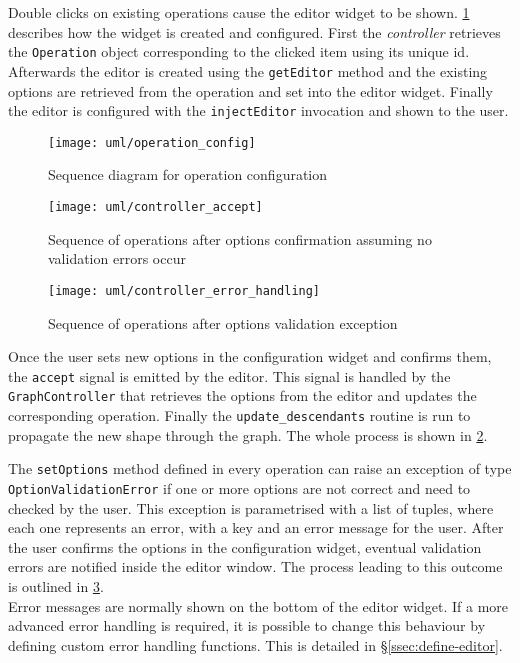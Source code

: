 \label{par:operation_config}\noindent
Double clicks on existing operations cause the editor widget to be shown. \cref{fig:operation_config_sequence} describes how the widget is created and configured. First the \textit{controller} retrieves the \texttt{Operation} object corresponding to the clicked item using its unique id. Afterwards the editor is created using the \texttt{getEditor} method and the existing options are retrieved from the operation and set into the editor widget. Finally the editor is configured with the \texttt{injectEditor} invocation and shown to the user.
\begin{figure}
	\centering
	\texttt{[image: uml/operation\_config]}
	\caption{Sequence diagram for operation configuration}
	\label{fig:operation_config_sequence}
\end{figure}

\begin{figure}[htbp]
	\centering
	\texttt{[image: uml/controller\_accept]}
	\caption[Sequence of operations after options confirmation in the editor]{Sequence of operations after options confirmation assuming no validation errors occur}
	\label{fig:controller_accept}
\end{figure}
\begin{figure}[htbp]
	\centering
	\texttt{[image: uml/controller\_error\_handling]}
	\caption{Sequence of operations after options validation exception}
	\label{fig:controller_error_handling}
\end{figure}
Once the user sets new options in the configuration widget and confirms them, the \texttt{accept} signal is emitted by the editor. This signal is handled by the \texttt{GraphController} that retrieves the options from the editor and updates the corresponding operation. Finally the \texttt{update\_descendants} routine is run to propagate the new shape through the graph. The whole process is shown in \cref{fig:controller_accept}.

\label{par:option_validation}\noindent
The \texttt{setOptions} method defined in every operation can raise an exception of type \texttt{OptionValidationError} if one or more options are not correct and need to checked by the user. This exception is parametrised with a list of tuples, where each one represents an error, with a key and an error message for the user. After the user confirms the options in the configuration widget, eventual validation errors are notified inside the editor window. The process leading to this outcome is outlined in \cref{fig:controller_error_handling}.\\
Error messages are normally shown on the bottom of the editor widget. If a more advanced error handling is required, it is possible to change this behaviour by defining custom error handling functions. This is detailed in §\ref{ssec:define-editor}.

